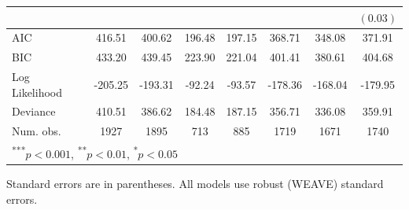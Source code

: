 \documentclass[a4paper]{article}\usepackage[]{graphicx}\usepackage[]{color}
\begin{document}
\begin{table}
\begin{center}
\begin{tabular}{l c c c c c c c }
                        &               &               &              &             &              &              & $(0.03)$    \\
\hline
AIC                     & 416.51        & 400.62        & 196.48       & 197.15      & 368.71       & 348.08       & 371.91      \\
BIC                     & 433.20        & 439.45        & 223.90       & 221.04      & 401.41       & 380.61       & 404.68      \\
Log Likelihood          & -205.25       & -193.31       & -92.24       & -93.57      & -178.36      & -168.04      & -179.95     \\
Deviance                & 410.51        & 386.62        & 184.48       & 187.15      & 356.71       & 336.08       & 359.91      \\
Num. obs.               & 1927          & 1895          & 713          & 885         & 1719         & 1671         & 1740        \\
\hline
\multicolumn{8}{l}{\scriptsize{\textsuperscript{***}$p<0.001$, 
  \textsuperscript{**}$p<0.01$, 
  \textsuperscript{*}$p<0.05$}}
\end{tabular}



\end{center}
{\scriptsize{
    Standard errors are in parentheses. All models use robust (WEAVE) standard errors. \\
}}
\end{table}
\end{document}
